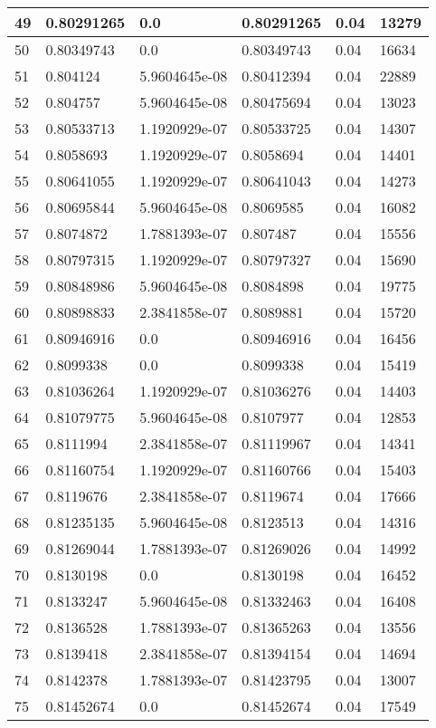 \begin{longtable}{|l|l|l|l|l|l|}
49 & 0.80291265 & 0.0 & 0.80291265 & 0.04 & 13279 \\ \hline 
50 & 0.80349743 & 0.0 & 0.80349743 & 0.04 & 16634 \\ \hline 
51 & 0.804124 & 5.9604645e-08 & 0.80412394 & 0.04 & 22889 \\ \hline 
52 & 0.804757 & 5.9604645e-08 & 0.80475694 & 0.04 & 13023 \\ \hline 
53 & 0.80533713 & 1.1920929e-07 & 0.80533725 & 0.04 & 14307 \\ \hline 
54 & 0.8058693 & 1.1920929e-07 & 0.8058694 & 0.04 & 14401 \\ \hline 
55 & 0.80641055 & 1.1920929e-07 & 0.80641043 & 0.04 & 14273 \\ \hline 
56 & 0.80695844 & 5.9604645e-08 & 0.8069585 & 0.04 & 16082 \\ \hline 
57 & 0.8074872 & 1.7881393e-07 & 0.807487 & 0.04 & 15556 \\ \hline 
58 & 0.80797315 & 1.1920929e-07 & 0.80797327 & 0.04 & 15690 \\ \hline 
59 & 0.80848986 & 5.9604645e-08 & 0.8084898 & 0.04 & 19775 \\ \hline 
60 & 0.80898833 & 2.3841858e-07 & 0.8089881 & 0.04 & 15720 \\ \hline 
61 & 0.80946916 & 0.0 & 0.80946916 & 0.04 & 16456 \\ \hline 
62 & 0.8099338 & 0.0 & 0.8099338 & 0.04 & 15419 \\ \hline 
63 & 0.81036264 & 1.1920929e-07 & 0.81036276 & 0.04 & 14403 \\ \hline 
64 & 0.81079775 & 5.9604645e-08 & 0.8107977 & 0.04 & 12853 \\ \hline 
65 & 0.8111994 & 2.3841858e-07 & 0.81119967 & 0.04 & 14341 \\ \hline 
66 & 0.81160754 & 1.1920929e-07 & 0.81160766 & 0.04 & 15403 \\ \hline 
67 & 0.8119676 & 2.3841858e-07 & 0.8119674 & 0.04 & 17666 \\ \hline 
68 & 0.81235135 & 5.9604645e-08 & 0.8123513 & 0.04 & 14316 \\ \hline 
69 & 0.81269044 & 1.7881393e-07 & 0.81269026 & 0.04 & 14992 \\ \hline 
70 & 0.8130198 & 0.0 & 0.8130198 & 0.04 & 16452 \\ \hline 
71 & 0.8133247 & 5.9604645e-08 & 0.81332463 & 0.04 & 16408 \\ \hline 
72 & 0.8136528 & 1.7881393e-07 & 0.81365263 & 0.04 & 13556 \\ \hline 
73 & 0.8139418 & 2.3841858e-07 & 0.81394154 & 0.04 & 14694 \\ \hline 
74 & 0.8142378 & 1.7881393e-07 & 0.81423795 & 0.04 & 13007 \\ \hline 
75 & 0.81452674 & 0.0 & 0.81452674 & 0.04 & 17549 \\ \hline 
\end{longtable}